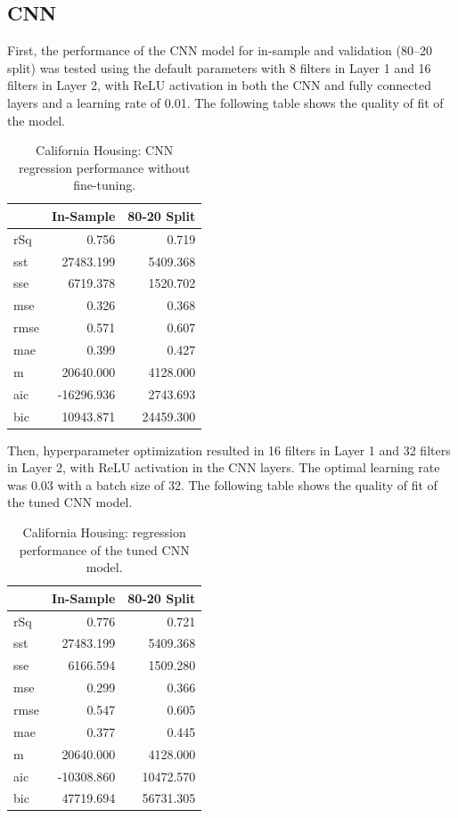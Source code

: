 \documentclass{article}
\begin{document}
\subsection{CNN}

First, the performance of the CNN model for in-sample and validation (80–20 split) was tested using the default parameters with 8 filters in Layer 1 and 16 filters in Layer 2, with ReLU activation in both the CNN and fully connected layers and a learning rate of 0.01. The following table shows the quality of fit of the model.
\begin{table}[H]
\centering
\caption{California Housing: CNN regression performance without fine-tuning.}
\label{tab:California_Housing_(In-Sample)}
\begin{tabular}{lrr}
\toprule
 & In-Sample & 80-20 Split \\
\midrule
rSq & 0.756 & 0.719 \\
sst & 27483.199 & 5409.368 \\
sse & 6719.378 & 1520.702 \\
mse & 0.326 & 0.368 \\
rmse & 0.571 & 0.607 \\
mae & 0.399 & 0.427 \\
m & 20640.000 & 4128.000 \\
aic & -16296.936 & 2743.693 \\
bic & 10943.871 & 24459.300 \\
\bottomrule
\end{tabular}
\end{table}

Then, hyperparameter optimization resulted in 16 filters in Layer 1 and 32 filters in Layer 2, with ReLU activation in the CNN layers. The optimal learning rate was 0.03 with a batch size of 32. The following table shows the quality of fit of the tuned CNN model.

\begin{table}[H]
\centering
\caption{California Housing: regression performance of the tuned CNN model.}
\label{tab:California_Housing_(In-Sample)}
\begin{tabular}{lrr}
\toprule
 & In-Sample & 80-20 Split \\
\midrule
rSq & 0.776 & 0.721 \\
sst & 27483.199 & 5409.368 \\
sse & 6166.594 & 1509.280 \\
mse & 0.299 & 0.366 \\
rmse & 0.547 & 0.605 \\
mae & 0.377 & 0.445 \\
m & 20640.000 & 4128.000 \\
aic & -10308.860 & 10472.570 \\
bic & 47719.694 & 56731.305 \\
\bottomrule
\end{tabular}
\end{table}
\end{document}
